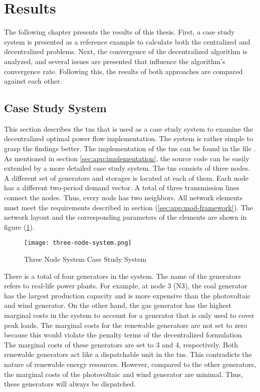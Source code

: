 \section{Results}
\label{sec:res}

The following chapter presents the results of this thesis. First, a case study system is presented as a reference example to calculate both the centralized and decentralized problems. Next, the convergence of the decentralized algorithm is analyzed, and several issues are presented that influence the algorithm's convergence rate. Following this, the results of both approaches are compared against each other.

\subsection{Case Study System}
\label{sec:res:tns}

This section describes the \gls{tns} that is used as a case study system to examine the decentralized optimal power flow implementation. The system is rather simple to grasp the findings better. The implementation of the \gls{tns} can be found in the file . As mentioned in section \ref{sec:app:implementation}, the source code can be easily extended by a more detailed case study system. The \gls{tns} consists of three nodes. A different set of generators and storages is located at each of them. Each node has a different two-period demand vector. A total of three transmission lines connect the nodes. Thus, every node has two neighbors. All network elements must meet the requirements described in section (\ref{sec:app:mod-framework}). The network layout and the corresponding parameters of the elements are shown in figure (\ref{fig:tns}).

\begin{figure}[h]
	\centering
	\texttt{[image: three-node-system.png]}
	\caption{Three Node System Case Study System}
	\label{fig:tns}
\end{figure}

There is a total of four generators in the system. The name of the generators refers to real-life power plants. For example, at node 3 (N3), the coal generator has the largest production capacity and is more expensive than the photovoltaic and wind generator. On the other hand, the gas generator has the highest marginal costs in the system to account for a generator that is only used to cover peak loads. The marginal costs for the renewable generators are not set to zero because this would violate the penalty terms of the decentralized formulation. The marginal costs of these generators are set to 3 and 4, respectively. Both renewable generators act like a dispatchable unit in the \gls{tns}. This contradicts the nature of renewable energy resources. However, compared to the other generators, the marginal costs of the photovoltaic and wind generator are minimal. Thus, these generators will always be dispatched.

